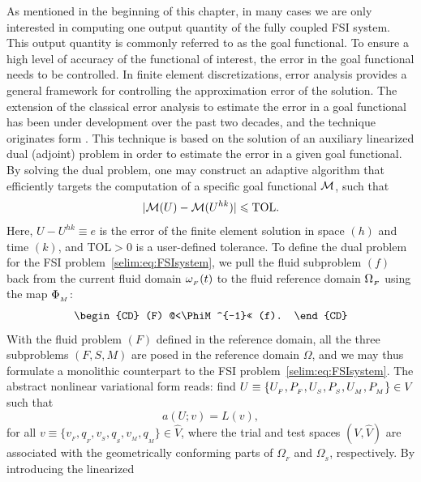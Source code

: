 As mentioned in the beginning of this chapter, in many cases we are
only interested in computing one output quantity of the fully coupled
FSI system. This output quantity is commonly referred to as the goal
functional.  To ensure a high level of accuracy of the functional of
interest, the error in the goal functional needs to be controlled. In
finite element discretizations, \apost{} error analysis
provides a general framework for controlling the approximation error
of the solution.  The extension of the classical \apost{}
error analysis to estimate the error in a goal functional has been
under development over the past two decades, and the technique
originates form \citet{ErikssonEstepEtAl1995,
BeckerRannacher2001}. This technique is based on the solution of an
auxiliary linearized dual (adjoint) problem in order to estimate the
error in a given goal functional. By solving the dual problem, one may
construct an adaptive algorithm that efficiently targets the
computation of a specific goal functional $\mathcal{M}$, such that
\begin{equation}
  \label{selim:eq:goalTOL}
|\mathcal{M}(U)-\mathcal{M}(U^{hk})| \leqslant \mathrm{TOL}.
\end{equation}
Here, $ U-U^{hk} \equiv e$ is the error of the finite element solution
in space $(h)$ and time $(k)$, and $\mathrm{TOL}>0$ is a user-defined
tolerance.  To define the dual problem for the FSI
problem~\eqref{selim:eq:FSIsystem}, we pull the fluid subproblem
$(f)$ back from the current fluid domain $\omega_{_{F}}(t)$ to the fluid reference
domain $\Omega_{_{F}}$ using the map $\Phi_{_{M}}$:
\begin{equation}
  \label{selim:eq:pullback}
  \begin{CD}
    (F) @<\PhiM^{-1}<< (f).
  \end{CD}
\end{equation}
With the fluid problem $(F)$ defined in the reference domain, all the
three subproblems $(F,S,M)$ are posed in the reference domain
$\Omega$, and we may thus formulate a monolithic counterpart to the
FSI problem~\eqref{selim:eq:FSIsystem}. The abstract nonlinear
variational form reads: find $U\equiv \{U_{_{F}}, P_{_{F}}, U_{_{S}}, P_{_{S}}, U_{_{M}},
P_{_{M}} \}\in V$ such that
\begin{equation}
\label{selim:eq:monolithic}
a(U;v) = L(v),
\end{equation}
for all $v\equiv\{ v_{_{F}}, q_{_{F}}, v_{_{S}}, q_{_{S}}, v_{_{M}}, q_{_{M}}
\}\in\hat{V}$, where the trial and test spaces $(V,\hat{V})$ are
associated with the geometrically conforming parts of $\Omega_{_{F}}$
and $\Omega_{_{S}}$, respectively. By introducing the linearized
